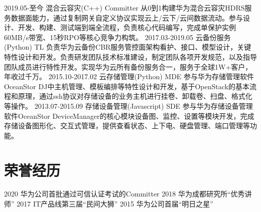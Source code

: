 \documentclass[]{resume}
\begin{document}
\begin{twenty}
  \twentyitem
    {2019.05-至今}
    {混合云容灾(C++)}
    {Committer}
    {从0到1构建华为混合云容灾HDRS服务数据面能力，通过复制网关自定义协议实现云上/云下/云间数据流动。参与设计、开发、构建、测试端到端全流程，负责核心代码编写，完成单保护实例60MB/s带宽、15秒RPO等核心竞争力构筑。}
  \twentyitem
    {2017.03-2019.05}
    {云备份服务(Python)}
    {TL}
    {负责华为云备份CBR服务管控面架构看护、接口、模型设计，关键特性设计和开发。负责研发团队技术标准建设，制定团队各项开发规范，以及指导团队成员进行特性开发。实现华为云所有备份服务合一，服务于全球1W+客户，年收过千万。}
\twentyitem
    {2015.10-2017.02}
    {云存储管理(Python)}
    {MDE}
    {参与华为存储管理软件OceanStor DJ中主机管理、模板编排等特性设计和开发，基于OpenStack的基本流程和原理，通过ssh协议对存储设备的业务主机进行挂卷、卸载卷、扫盘、格式化等操作。}
\twentyitem
    {2013.07-2015.09}
    {存储设备管理(Javascript)}
    {SDE}
    {参与华为存储设备管理软件OceanStor DeviceManager的核心模块设备图、监控、设置等模块开发，完成存储设备图形化、交互式管理，提供查看状态、上下电、硬盘管理、端口管理等功能。}
\end{twenty}

\section{荣誉经历}

\begin{twentyshort}
  \twentyitemshort
    {2020}
    {华为公司首批通过可信认证考试的Committer}
  \twentyitemshort
    {2018}
    {华为成都研究所“优秀讲师”}
  \twentyitemshort
    {2017}
    {IT产品线第三届“民间大狮”}
  \twentyitemshort
    {2015}
    {华为公司首届“明日之星”}
\end{twentyshort}

\end{document}
